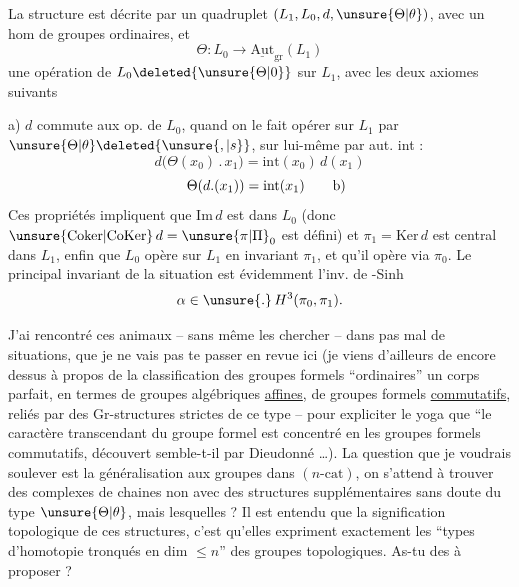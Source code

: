 La structure est décrite par un quadruplet $(L_1,L_0,d,\unsure{\Theta|\theta})$, avec
un hom de groupes ordinaires, et
\[
\Theta:L_0\longrightarrow\underline{\mathrm{Aut}}_{\mathrm{gr}}(L_1)
\]
une opération de $L_0\deleted{\unsure{\Theta|0}}$ sur $L_1$, avec les
deux axiomes suivants

a) $d$ commute aux op. de $L_0$, quand on le fait opérer sur $L_1$ par $\unsure{\Theta|\theta}\deleted{\unsure{,|s}}$, sur lui-même par aut. int :
\[
d\bigl(\Theta(x_0)\mathbin{.}x_1\bigr)=\mathrm{int}(x_0)\,d(x_1)
\]
\[
\Theta(d.(x_1))=\mathrm{int}(x_1)\tag*{\makebox[0pt][r]{\makebox[\displaywidth][l]{b)}}}
\]
Ces propriétés impliquent que $\mathrm{Im}\,d$ est  dans $L_0$ (donc $\unsure{\mathrm{Coker}|\mathrm{CoKer}}\,d=\unsure{\pi|\Pi}_0$ est défini) et $\pi_1=\mathrm{Ker}\,d$ est central dans $L_1$, enfin que $L_0$ opère sur $L_1$ en invariant $\pi_1$, et qu'il opère via $\pi_0$. Le principal invariant  de la situation est évidemment l'inv. de -Sinh
\[
\alpha\in\unsure{.}\,H^3(\pi_0,\pi_1).
\]

J'ai rencontré ces animaux -- sans même les chercher -- dans pas mal de situations, que je ne vais pas te passer en revue ici (je viens d'ailleurs de  encore dessus à propos de la classification des groupes formels ``ordinaires''  un corps parfait, en termes de groupes algébriques \uline{affines}, de groupes formels \uline{commutatifs}, reliés par des Gr-structures strictes de ce type%
 -- pour expliciter le yoga que ``le caractère transcendant du
groupe formel est concentré en les groupes formels commutatifs, découvert semble-t-il par Dieudonné \dots). La question que je voudrais soulever est la généralisation aux groupes dans $(n\text{-cat})$, on s'attend à trouver des complexes de chaines non 
avec des structures supplémentaires sans doute du type $\unsure{\Theta|\theta}$, mais lesquelles ? Il est entendu que la signification topologique de ces structures, c'est qu'elles expriment exactement les ``types d'homotopie tronqués en dim $\leq n$'' des groupes topologiques.  As-tu des  à proposer ?

